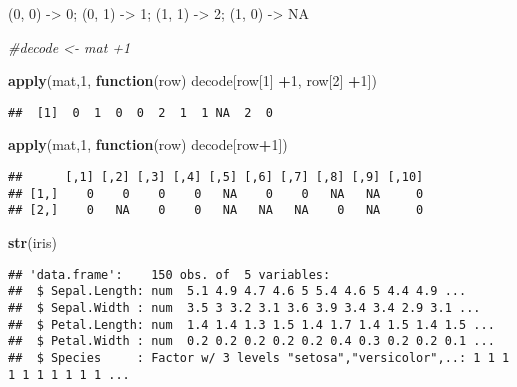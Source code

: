 \documentclass[]{article}
\newenvironment{Shaded}{\begin{snugshade}}{\end{snugshade}}
\newcommand{\CommentTok}[1]{\textcolor[rgb]{0.56,0.35,0.01}{\textit{#1}}}
\newcommand{\ControlFlowTok}[1]{\textcolor[rgb]{0.13,0.29,0.53}{\textbf{#1}}}
\newcommand{\DecValTok}[1]{\textcolor[rgb]{0.00,0.00,0.81}{#1}}
\newcommand{\KeywordTok}[1]{\textcolor[rgb]{0.13,0.29,0.53}{\textbf{#1}}}
\newcommand{\NormalTok}[1]{#1}
\newcommand{\OperatorTok}[1]{\textcolor[rgb]{0.81,0.36,0.00}{\textbf{#1}}}
\begin{document}
(0, 0) -\textgreater{} 0; (0, 1) -\textgreater{} 1; (1, 1)
-\textgreater{} 2; (1, 0) -\textgreater{} NA

\begin{Shaded}
\begin{Highlighting}[]
\CommentTok{#decode <- mat +1}
\end{Highlighting}
\end{Shaded}

\begin{Shaded}
\begin{Highlighting}[]
\KeywordTok{apply}\NormalTok{(mat,}\DecValTok{1}\NormalTok{, }\ControlFlowTok{function}\NormalTok{(row) decode[row[}\DecValTok{1}\NormalTok{] }\OperatorTok{+}\DecValTok{1}\NormalTok{, row[}\DecValTok{2}\NormalTok{] }\OperatorTok{+}\DecValTok{1}\NormalTok{])}
\end{Highlighting}
\end{Shaded}

\begin{verbatim}
##  [1]  0  1  0  0  2  1  1 NA  2  0
\end{verbatim}

\begin{Shaded}
\begin{Highlighting}[]
\KeywordTok{apply}\NormalTok{(mat,}\DecValTok{1}\NormalTok{, }\ControlFlowTok{function}\NormalTok{(row) decode[row}\OperatorTok{+}\DecValTok{1}\NormalTok{])}
\end{Highlighting}
\end{Shaded}

\begin{verbatim}
##      [,1] [,2] [,3] [,4] [,5] [,6] [,7] [,8] [,9] [,10]
## [1,]    0    0    0    0   NA    0    0   NA   NA     0
## [2,]    0   NA    0    0   NA   NA   NA    0   NA     0
\end{verbatim}

\begin{Shaded}
\begin{Highlighting}[]
\KeywordTok{str}\NormalTok{(iris)}
\end{Highlighting}
\end{Shaded}

\begin{verbatim}
## 'data.frame':    150 obs. of  5 variables:
##  $ Sepal.Length: num  5.1 4.9 4.7 4.6 5 5.4 4.6 5 4.4 4.9 ...
##  $ Sepal.Width : num  3.5 3 3.2 3.1 3.6 3.9 3.4 3.4 2.9 3.1 ...
##  $ Petal.Length: num  1.4 1.4 1.3 1.5 1.4 1.7 1.4 1.5 1.4 1.5 ...
##  $ Petal.Width : num  0.2 0.2 0.2 0.2 0.2 0.4 0.3 0.2 0.2 0.1 ...
##  $ Species     : Factor w/ 3 levels "setosa","versicolor",..: 1 1 1 1 1 1 1 1 1 1 ...
\end{verbatim}
\end{document}
